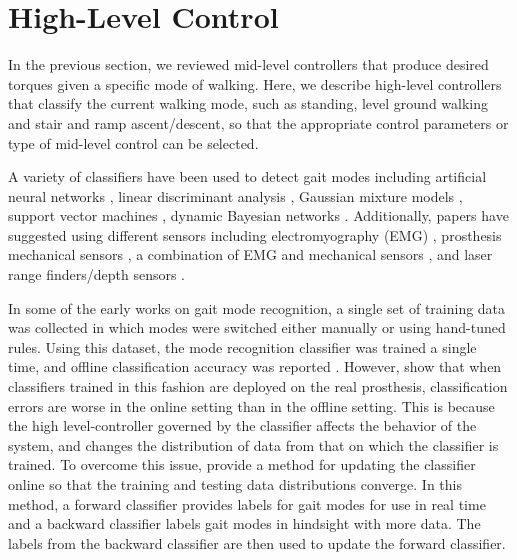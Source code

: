 \section{High-Level Control}\label{sec:back_high_level_control}

In the previous section, we reviewed mid-level controllers that produce desired
torques given a specific mode of walking. Here, we describe high-level
controllers that classify the current walking mode, such as standing, level
ground walking and stair and ramp ascent/descent, so that the appropriate
control parameters or type of mid-level control can be selected. 

A variety of classifiers have been used to detect gait modes including
artificial neural networks \citep{huang2009strategy}, linear discriminant
analysis
\citep{huang2009strategy,huang2011continuous,hargrove2015intuitive,young2014intent},
Gaussian mixture models \citep{varol2010multiclass}, support vector machines
\citep{huang2011continuous,massalin2017user,yan2018locomotion}, dynamic Bayesian
networks \citep{young2014intent,hargrove2015intuitive,spanias2018online}.
Additionally, papers have suggested using different sensors including
electromyography (EMG) \citep{huang2009strategy}, prosthesis mechanical sensors
\citep{varol2010multiclass,young2014intent,young2014training}, a combination of
EMG and mechanical sensors
\citep{huang2011continuous,spanias2018online,hargrove2015intuitive}, and laser
range finders/depth sensors
\citep{zhang2011preliminary,liu2016development,massalin2017user,yan2018locomotion}.

In some of the early works on gait mode recognition, a single set of training
data was collected in which modes were switched either manually or using
hand-tuned rules. Using this dataset, the mode recognition classifier was
trained a single time, and offline classification accuracy was reported
\citep{huang2009strategy,huang2011continuous,young2014intent}. However,
\citet{hargrove2015intuitive} show that when classifiers trained in this fashion
are deployed on the real prosthesis, classification errors are worse in the
online setting than in the offline setting. This is because the high
level-controller governed by the classifier affects the behavior of the system,
and changes the distribution of data from that on which the classifier is
trained. To overcome this issue, \citet{spanias2018online} provide a method for
updating the classifier online so that the training and testing data
distributions converge. In this method, a forward classifier provides labels
for gait modes for use in real time and a backward classifier labels gait modes
in hindsight with more data. The labels from the backward classifier are then
used to update the forward classifier. 
